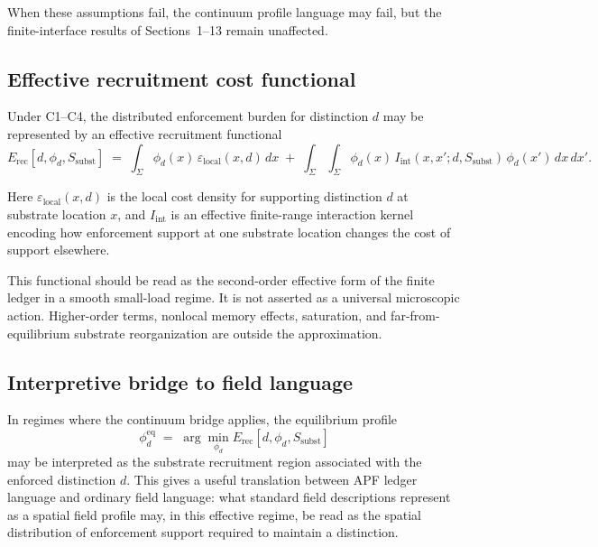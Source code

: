 \documentclass[11pt]{article}
\begin{document}
When these assumptions fail, the continuum profile language may fail,
but the finite-interface results of Sections~1--13 remain unaffected.

\subsection{Effective recruitment cost functional}\label{subsec:effective-recruitment-functional}

Under C1--C4, the distributed enforcement burden for distinction $d$
may be represented by an effective recruitment functional
\begin{equation}\label{eq:Erec}
E_{\mathrm{rec}}[d, \phi_d, S_{\mathrm{subst}}]
\;=\;
\int_\Sigma \phi_d(x)\, \varepsilon_{\mathrm{local}}(x, d)\, dx
\;+\;
\int_\Sigma\!\!\int_\Sigma \phi_d(x)\,
I_{\mathrm{int}}(x, x'; d, S_{\mathrm{subst}})\,
\phi_d(x')\, dx\, dx'.
\end{equation}

Here $\varepsilon_{\mathrm{local}}(x, d)$ is the local cost density for
supporting distinction $d$ at substrate location $x$, and
$I_{\mathrm{int}}$ is an effective finite-range interaction kernel
encoding how enforcement support at one substrate location changes the
cost of support elsewhere.

This functional should be read as the second-order effective form of the
finite ledger in a smooth small-load regime.  It is not asserted as a
universal microscopic action.  Higher-order terms, nonlocal memory
effects, saturation, and far-from-equilibrium substrate reorganization
are outside the approximation.

\subsection{Interpretive bridge to field language}\label{subsec:field-interpretive-bridge}

In regimes where the continuum bridge applies, the equilibrium profile
\[
    \phi_d^{\mathrm{eq}}
    \;=\;
    \arg\min_{\phi_d} E_{\mathrm{rec}}[d, \phi_d, S_{\mathrm{subst}}]
\]
may be interpreted as the substrate recruitment region associated with
the enforced distinction $d$.  This gives a useful translation between
APF ledger language and ordinary field language: what standard field
descriptions represent as a spatial field profile may, in this
effective regime, be read as the spatial distribution of enforcement
support required to maintain a distinction.
\end{document}
